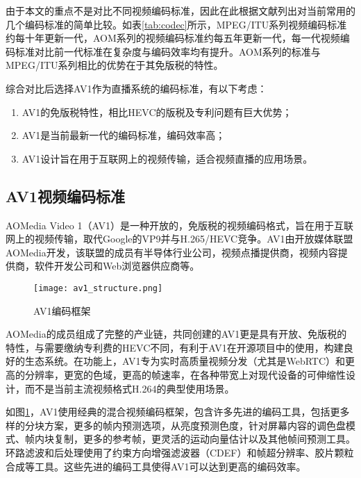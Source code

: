 由于本文的重点不是对比不同视频编码标准，因此在此根据文献\cite{groisCodingEfficiencyComparison2016, akyaziComparisonCompressionEfficiency2018a, zhangComparingVVCHEVC2020}列出对当前常用的几个编码标准的简单比较。如表\ref{tab:codec}所示，MPEG/ITU系列视频编码标准约每十年更新一代，AOM系列的视频编码标准约每五年更新一代，每一代视频编码标准对比前一代标准在复杂度与编码效率均有提升。AOM系列的标准与MPEG/ITU系列相比的优势在于其免版税的特性。

综合对比后选择AV1作为直播系统的编码标准，有以下考虑：
\begin{enumerate} [label=\arabic*)]
  \item AV1的免版税特性，相比HEVC的版税及专利问题有巨大优势；
  \item AV1是当前最新一代的编码标准，编码效率高；
  \item AV1设计旨在用于互联网上的视频传输，适合视频直播的应用场景。
\end{enumerate}

\subsection{AV1视频编码标准}

AOMedia Video 1\cite{rivazAV1BitstreamDecoding2019}（AV1）是一种开放的，免版税的视频编码格式，旨在用于互联网上的视频传输，取代Google的VP9并与H.265/HEVC竞争。AV1由开放媒体联盟AOMedia开发，该联盟的成员有半导体行业公司，视频点播提供商，视频内容提供商，软件开发公司和Web浏览器供应商等。

\begin{figure}[!htp]
	\centering
	\texttt{[image: av1\_structure.png]}
	\caption{AV1编码框架\cite{trowAV1ImplementationPerformance2020}}
	\label{fig:av1-structure}
\end{figure}

AOMedia的成员组成了完整的产业链，共同创建的AV1更是具有开放、免版税的特性，与需要缴纳专利费的HEVC不同，有利于AV1在开源项目中的使用，构建良好的生态系统。在功能上，AV1专为实时高质量视频分发（尤其是WebRTC）和更高的分辨率，更宽的色域，更高的帧速率，在各种带宽上对现代设备的可伸缩性设计，而不是当前主流视频格式H.264的典型使用场景。

如图\ref{fig:av1-structure}，AV1使用经典的混合视频编码框架，包含许多先进的编码工具\cite{chenOverviewCoreCoding2018}，包括更多样的分块方案，更多的帧内预测选项，从亮度预测色度\cite{trudeauPredictingChromaLuma2018a}，针对屏幕内容的调色盘模式、帧内块复制\cite{liIntraBlockCopy2018}，更多的参考帧\cite{linEfficientAV1Video2018}，更灵活的运动向量估计以及其他帧间预测工具。环路滤波和后处理使用了约束方向增强滤波器（CDEF）\cite{midtskogenAv1ConstrainedDirectional2018}和帧超分辨率、胶片颗粒合成\cite{norkinFilmGrainSynthesis2018}等工具。这些先进的编码工具使得AV1可以达到更高的编码效率。

